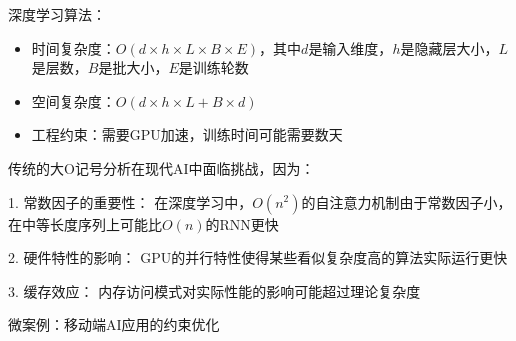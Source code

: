 深度学习算法：
\begin{itemize}
\item 时间复杂度：$O(d \times h \times L \times B \times E)$，其中$d$是输入维度，$h$是隐藏层大小，$L$是层数，$B$是批大小，$E$是训练轮数
\item 空间复杂度：$O(d \times h \times L + B \times d)$
\item 工程约束：需要GPU加速，训练时间可能需要数天
\end{itemize}

%
%
%
%
%
%


传统的大O记号分析在现代AI中面临挑战，因为：

1. 常数因子的重要性： 在深度学习中，$O(n^2)$的自注意力机制由于常数因子小，在中等长度序列上可能比$O(n)$的RNN更快

2. 硬件特性的影响： GPU的并行特性使得某些看似复杂度高的算法实际运行更快

3. 缓存效应： 内存访问模式对实际性能的影响可能超过理论复杂度

微案例：移动端AI应用的约束优化

